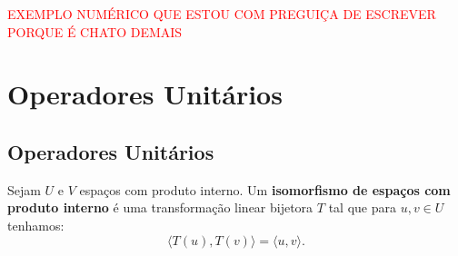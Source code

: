 \documentclass[11pt,twoside,a4paper]{book}
\begin{document}
\bigskip
\noindent
\textcolor{red}{EXEMPLO NUMÉRICO QUE ESTOU COM PREGUIÇA DE ESCREVER PORQUE É CHATO DEMAIS}

\newpage

\section{Operadores Unitários}

\subsection{Operadores Unitários}

\begin{definicao}
Sejam $U$ e $V$ espaços com produto interno. Um \textbf{isomorfismo de espaços com produto interno} é uma transformação linear bijetora $T$ tal que para $u,v\in U$ tenhamos:
\[
\langle T(u),T(v)\rangle=\langle u,v\rangle.
\]
\end{definicao}
\end{document}
